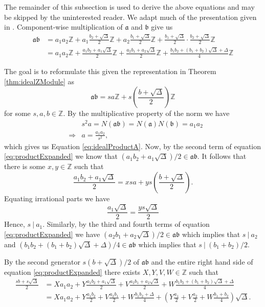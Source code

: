 \documentclass{ucalgthes1}
\theoremstyle{definition}
\newcommand{\ZZ}{\mathbb{Z}}
\begin{document}
The remainder of this subsection is used to derive the above equations and may be skipped by the uninterested reader.  We adapt much of the presentation given in \cite[pp.117,118]{Jacobson2009}. Component-wise multiplication of $\mathfrak a$ and $\mathfrak b$ give us
\begin{equation}
\begin{split}
	\mathfrak{a} \mathfrak{b} & = a_1a_2 \ZZ + a_1 \frac{b_2 + \sqrt{\Delta}}{2} \ZZ + a_2 \frac{b_1 + \sqrt{\Delta}}{2} \ZZ + \frac{b_1 + \sqrt{\Delta}}{2} \cdot \frac{b_2 + \sqrt{\Delta}}{2} \ZZ \\
	& = a_1a_2 \ZZ + \frac{a_1b_2 + a_1\sqrt{\Delta}}{2} \ZZ + \frac{a_2b_1 + a_2\sqrt{\Delta}}{2} \ZZ + \frac{b_1b_2 + (b_1+b_2)\sqrt{\Delta} + \Delta}{4} \ZZ \label{eq:productExpanded}
\end{split}
\end{equation}

\noindent
The goal is to reformulate this given the representation in Theorem \eqref{thm:idealZModule} as
\[
	\mathfrak{a} \mathfrak{b} = sa \ZZ + s \left(\frac{b + \sqrt{\Delta}}{2}\right) \ZZ
\]
for some $s, a, b \in \ZZ$.  By the multiplicative property of the norm we have
\begin{eqnarray*}
	&& s^2a = N(\mathfrak{a}\mathfrak{b}) = N(\mathfrak{a})N(\mathfrak{b}) = a_1 a_2 \\
	& \Rightarrow & a = \frac{a_1a_2}{s^2},
\end{eqnarray*}
which gives us Equation \ref{eq:idealProductA}. Now, by the second term of equation \eqref{eq:productExpanded} we know that $(a_1b_2 + a_1\sqrt{\Delta})/2 \in \mathfrak{a}\mathfrak{b}$.  It follows that there is some $x,y \in \ZZ$ such that
\[
	\frac{a_1b_2 + a_1\sqrt{\Delta}}{2} = xsa + ys\left(\frac{b+\sqrt{\Delta}}{2}\right).
\]
Equating irrational parts we have
\begin{equation*}
	\frac{a_1\sqrt{\Delta}}{2} = \frac{ys\sqrt{\Delta}}{2}
\end{equation*}
\noindent
Hence, $s ~|~ a_1$.  Similarly, by the third and fourth terms of equation \eqref{eq:productExpanded} we have $(a_2b_1+a_2\sqrt{\Delta})/2 \in \mathfrak{a}\mathfrak{b}$ which implies that $s~|~a_2$ and $(b_1b_2 + (b_1+b_2)\sqrt{\Delta} + \Delta)/4 \in \mathfrak{a}\mathfrak{b}$ which implies that $s~|~(b_1+b_2)/2$. 

By the second generator $s(b+\sqrt\Delta)/2$ of $\mathfrak{a}\mathfrak{b}$ and the entire right hand side of equation \eqref{eq:productExpanded} there exists $X, Y, V, W \in \ZZ$ such that
\begin{equation}
\label{eq:productSecond}
\begin{split}
	\frac{sb+s\sqrt\Delta}{2} & = Xa_1a_2 + Y\frac{a_1b_2+a_1\sqrt\Delta}{2} + V\frac{a_2b_1 + a_2\sqrt{\Delta}}{2} + W\frac{b_1b_2 + (b_1+b_2)\sqrt{\Delta} + \Delta}{4} \\
	& = Xa_1a_2 + Y\frac{a_1b_2}{2} + V\frac{a_2b_1}{2} + W\frac{b_1b_2 + \Delta}{4} + \left(Y\frac{a_1}{2} + V\frac{a_2}{2} + W\frac{b_1+b_2}{4}\right)\sqrt\Delta. 
\end{split}
\end{equation}
\end{document}
